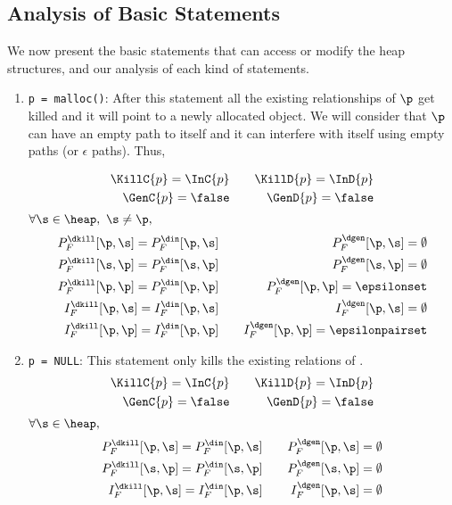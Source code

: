 \subsection{Analysis of Basic Statements} \label{Analysis_of_Basic_Statements} 
We now present the basic statements that can access or modify
the heap structures, and our analysis of each kind of
statements.
\begin{enumerate}\is
\item {{\tt p = malloc()}}:
  After this statement all the existing relationships of $\p$ get killed and it will point to a
newly allocated object. We will consider that $\p$ can have an empty path to itself and it can interfere
with itself using empty paths (or $\epsilon$ paths). Thus,

\begin{eqnarray*}
  \KillC{p}  = \InC{p} &\quad& \KillD{p} = \InD{p} \\
  \GenC{p} = \false 	 &\quad& \GenD{p} = \false 
\end{eqnarray*}
$\forall \s \in \heap,\ \s \not= \p,$
\begin{eqnarray*}
  P_F^{\dkill}[\p,\s]  =  P_F^{\din}[\p,\s] &\quad&
  P_F^{\dgen}[\p,\s]    =  \emptyset \\ 
  P_F^{\dkill}[\s,\p]  =  P_F^{\din}[\s,\p] &\quad&
  P_F^{\dgen}[\s,\p]    =  \emptyset \\
  P_F^{\dkill}[\p,\p]  =  P_F^{\din}[\p,\p] &\quad&
  P_F^{\dgen}[\p,\p]    =  \epsilonset\\
  I_F^{\dkill}[\p,\s]  =  I_F^{\din}[\p,\s] &\quad&
  I_F^{\dgen}[\p,\s]    =  \emptyset \\
  I_F^{\dkill}[\p,\p]  =  I_F^{\din}[\p,\p] &\quad&
  I_F^{\dgen}[\p,\p]    =  \epsilonpairset 
\end{eqnarray*}


\item{\tt p = NULL}:
This statement only kills the existing relations of \p.
\begin{eqnarray*}
  \KillC{p}  = \InC{p} &\quad& \KillD{p} = \InD{p} \\
  \GenC{p} = \false 	 &\quad& \GenD{p} = \false \\
\end{eqnarray*}
$\forall \s \in \heap,$
\begin{eqnarray*}
  P_F^{\dkill}[\p,\s]  =  P_F^{\din}[\p,\s] &\quad&
  P_F^{\dgen}[\p,\s]    =  \emptyset \\ 
  P_F^{\dkill}[\s,\p]  =  P_F^{\din}[\s,\p] &\quad&
  P_F^{\dgen}[\s,\p]    =  \emptyset \\
  I_F^{\dkill}[\p,\s]  =  I_F^{\din}[\p,\s] &\quad&
  I_F^{\dgen}[\p,\s]    =  \emptyset 
\end{eqnarray*}


\end{enumerate}
